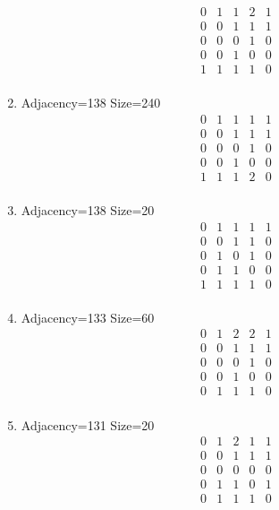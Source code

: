 \documentclass[12pt]{article}
\begin{document}
\begin{multicols}{3}
\begin{enumerate}
\begin{equation*}
\begin{array}{ccccc}
0&1&1&2&1\\
0&0&1&1&1\\
0&0&0&1&0\\
0&0&1&0&0\\
1&1&1&1&0\\
\end{array}
\end{equation*}
\item Adjacency=138 Size=240
\begin{equation*}
\begin{array}{ccccc}
0&1&1&1&1\\
0&0&1&1&1\\
0&0&0&1&0\\
0&0&1&0&0\\
1&1&1&2&0\\
\end{array}
\end{equation*}
\item Adjacency=138 Size=20
\begin{equation*}
\begin{array}{ccccc}
0&1&1&1&1\\
0&0&1&1&0\\
0&1&0&1&0\\
0&1&1&0&0\\
1&1&1&1&0\\
\end{array}
\end{equation*}
\item Adjacency=133 Size=60
\begin{equation*}
\begin{array}{ccccc}
0&1&2&2&1\\
0&0&1&1&1\\
0&0&0&1&0\\
0&0&1&0&0\\
0&1&1&1&0\\
\end{array}
\end{equation*}
\item Adjacency=131 Size=20
\begin{equation*}
\begin{array}{ccccc}
0&1&2&1&1\\
0&0&1&1&1\\
0&0&0&0&0\\
0&1&1&0&1\\
0&1&1&1&0\\

\end{array}
\end{equation*}
\end{enumerate}
\end{multicols}
\end{document}
